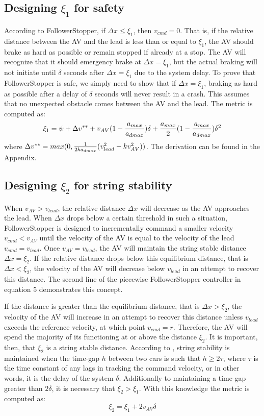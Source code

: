 \documentclass[conference]{IEEEtran}
\begin{document}
\subsection{Designing $\xi_1$ for safety}
According to FollowerStopper, if $\Delta x \leq \xi_1$, then $v_{cmd}=0$. That is, if the relative distance between the AV and the lead is less than or equal to $\xi_1$, the AV should brake as hard as possible or remain stopped if already at a stop. The AV will recognize that it should emergency brake at $\Delta x=\xi_1$, but the actual braking will not initiate until $\delta$ seconds after $\Delta x=\xi_1$ due to the system delay. To prove that FollowerStopper is safe, we simply need to show that if $\Delta x = \xi_1$, braking as hard as possible after a delay of $\delta$ seconds will never result in a crash. This assumes that no unexpected obstacle comes between the AV and the lead. The metric is computed as:
\begin{dmath}
\xi_1 = \psi +\Delta v^{**}+v_{AV}(1-{a_{max}\over a_{dmax}})\delta+{a_{max}\over 2}(1-{a_{max}\over a_{dmax}})\delta^2
\end{dmath}
where $\Delta v^{**} = max(0,{1\over 2ka_{dmax}}(v_{lead}^2-kv_{AV}^2))$. The derivation can be found in the Appendix.

\subsection{Designing $\xi_2$ for string stability}
When $v_{AV}>v_{lead}$, the relative distance $\Delta x$ will decrease as the AV approaches the lead. When $\Delta x$ drops below a certain threshold in such a situation, FollowerStopper is designed to incrementally command a smaller velocity $v_{cmd}<v_{AV}$ until the velocity of the AV is equal to the velocity of the lead $v_{cmd}=v_{lead}$. Once $v_{AV}=v_{lead}$, the AV will maintain the string stable distance $\Delta x=\xi_2$. If the relative distance drops below this equilibrium distance, that is $\Delta x<\xi_2$, the velocity of the AV will decrease below $v_{lead}$ in an attempt to recover this distance. The second line of the piecewise FollowerStopper controller in equation 5 demonstrates this concept.

 If the distance is greater than the equilibrium distance, that is $\Delta x>\xi_2$, the velocity of the AV will increase in an attempt to recover this distance unless $v_{lead}$ exceeds the reference velocity, at which point $v_{cmd}=r$. Therefore, the AV will spend the majority of its functioning at or above the distance $\xi_2$. It is important, then, that $\xi_2$ is a string stable distance. According to \cite{rajamani2011vehicle}, string stability is maintained when the time-gap $h$ between two cars is such that $h\geq2\tau$, where $\tau$ is the time constant of any lags in tracking the command velocity, or in other words, it is the delay of the system $\delta$. Additionally to maintaining a time-gap greater than $2\delta$, it is necessary that $\xi_2>\xi_1$. With this knowledge the metric is computed as: 
 \begin{dmath}
 \xi_2 = \xi_1 + 2v_{AV}\delta
 \end{dmath}
\end{document}
